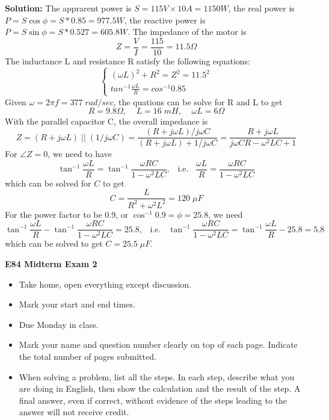  {\bf Solution:} 
 The apprarent power is $S=115V \times 10A = 1150 W$, the real power is
 $P=S\cos \phi=S*0.85=977.5 W$, the reactive power is 
 $P=S\sin \phi=S*0.527=605.8 W$. The impedance of the motor is
 \[	Z=\frac{V}{I}=\frac{115}{10}=11.5\Omega \]
 The inductance L and resistance R satisfy the following equations:
 \[ \left\{ \begin{array}{l} (\omega L)^2+R^2=Z^2=11.5^2 \\
 	tan^{-1} \frac{\omega L}{R}=cos^{-1} 0.85 \end{array} \right. \]
 Given $\omega=2\pi f=377\;rad/sec$, the quations can be solve for R and
 L to get
 \[	R=9.8\Omega,\;\;\;\;L=16\;mH,\;\;\;\;\omega L=6\Omega	\]
 With the parallel capacitor C, the overall impedance is
 \[	Z=(R+j\omega L)\; || \;(1/j\omega C)
 	=\frac{(R+j\omega L)/j\omega C}{(R+j\omega L)+1/j\omega C}
 	=\frac{R+j\omega L}{j\omega CR-\omega^2 LC+1}	\]
 For $\angle Z=0$, we need to have
 \[ \tan^{-1}\frac{\omega L}{R}=\tan^{-1}\frac{\omega RC}{1-\omega^2 LC},
 	\;\;\;\mbox{i.e.}\;\;\;	
 	\frac{\omega L}{R}=\frac{\omega RC}{1-\omega^2 LC}	\]
 which can be solved for $C$ to get
 \[	C=\frac{L}{R^2+\omega^2 L^2}=120\;\mu F	\]
 For the power factor to be 0.9, or $\cos^{-1} 0.9=\phi=25.8$, we need
 \[ \tan^{-1}\frac{\omega L}{R}-\tan^{-1}\frac{\omega RC}{1-\omega^2 LC}
 	=25.8,	\;\;\;\mbox{i.e.}\;\;\;	
 \tan^{-1}\frac{\omega RC}{1-\omega^2 LC}=\tan^{-1}\frac{\omega L}{R}-25.8=
 	5.8 \]
 which can be solved to get $C=25.5\;\mu F$.

\usepackage{html}

\begin{center}
{\Large \bf E84 Midterm Exam 2}
\end{center}

\begin{itemize}
\item Take home, open everything except discussion.
\item Mark your start and end times. %
\item Due Monday in class.
\item Mark your name and question number clearly on top of each page.
	Indicate the total number of pages submitted.
\item When solving a problem, list all the steps. In each step, describe 
	what you are doing in English, then show the calculation and the 
	result of the step. A final answer, even if correct, without 
	evidence of the steps leading to the answer will not receive credit.
\end{itemize}

